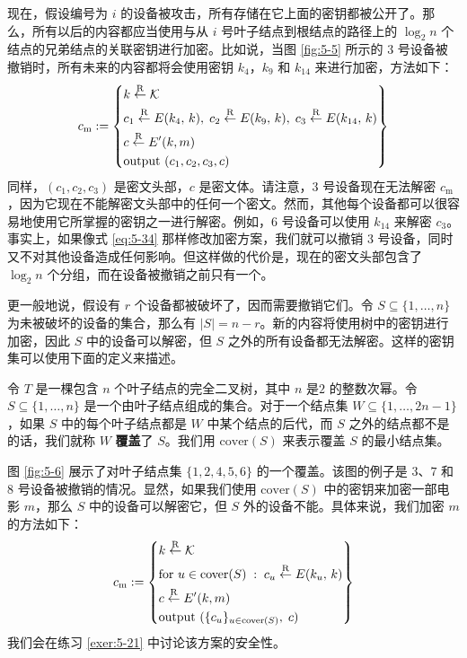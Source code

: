 \begin{snote}[撤销设备。]
现在，假设编号为 $i$ 的设备被攻击，所有存储在它上面的密钥都被公开了。那么，所有以后的内容都应当使用与从 $i$ 号叶子结点到根结点的路径上的 $\log_2n$ 个结点的兄弟结点的关联密钥进行加密。比如说，当图 \ref{fig:5-5} 所示的 $3$ 号设备被撤销时，所有未来的内容都将会使用密钥 $k_4$，$k_9$ 和 $k_{14}$ 来进行加密，方法如下：
\begin{equation}\label{eq:5-34}
c_\mathrm{m}:=
\left\{
\begin{aligned}
& k\overset{\rm R}\leftarrow\mathcal{K}\\
& c_1\overset{\rm R}\leftarrow E(k_4,\,k),\;
c_2\overset{\rm R}\leftarrow E(k_9,\,k),\;
c_3\overset{\rm R}\leftarrow E(k_{14},\,k)\\
& c\overset{\rm R}\leftarrow E'(k,m)\\
& \text{output } (c_1,c_2,c_3,c)
\end{aligned}
\right\}
\end{equation}
同样，$(c_1,c_2,c_3)$ 是密文头部，$c$ 是密文体。请注意，$3$ 号设备现在无法解密 $c_\mathrm{m}$，因为它现在不能解密文头部中的任何一个密文。然而，其他每个设备都可以很容易地使用它所掌握的密钥之一进行解密。例如，$6$ 号设备可以使用 $k_{14}$ 来解密 $c_3$。事实上，如果像式 \ref{eq:5-34} 那样修改加密方案，我们就可以撤销 $3$ 号设备，同时又不对其他设备造成任何影响。但这样做的代价是，现在的密文头部包含了 $\log_2n$ 个分组，而在设备被撤销之前只有一个。

更一般地说，假设有 $r$ 个设备都被破坏了，因而需要撤销它们。令 $S\subseteq\{1,\dots,n\}$ 为未被破坏的设备的集合，那么有 $|S|=n-r$。新的内容将使用树中的密钥进行加密，因此 $S$ 中的设备可以解密，但 $S$ 之外的所有设备都无法解密。这样的密钥集可以使用下面的定义来描述。
\end{snote}

\begin{definition}\label{def:5-4}
令 $T$ 是一棵包含 $n$ 个叶子结点的完全二叉树，其中 $n$ 是$2$ 的整数次幂。令 $S\subseteq\{1,\dots,n\}$ 是一个由叶子结点组成的集合。对于一个结点集 $W\subseteq\{1,\dots,2n-1\}$，如果 $S$ 中的每个叶子结点都是 $W$ 中某个结点的后代，而 $S$ 之外的结点都不是的话，我们就称 $W$ \textbf{覆盖}了 $S$。我们用 $\mathrm{cover}(S)$ 来表示覆盖 $S$ 的最小结点集。
\end{definition}

图 \ref{fig:5-6} 展示了对叶子结点集 $\{1,2,4,5,6\}$ 的一个覆盖。该图的例子是 $3$、$7$ 和 $8$ 号设备被撤销的情况。显然，如果我们使用 $\mathrm{cover}(S)$ 中的密钥来加密一部电影 $m$，那么 $S$ 中的设备可以解密它，但 $S$ 外的设备不能。具体来说，我们加密 $m$ 的方法如下：
\begin{equation}\label{eq:5-35}
c_\mathrm{m}:=
\left\{
\begin{aligned}
& k\overset{\rm R}\leftarrow\mathcal{K}\\
& \text{for } u\in\mathrm{cover}(S)\;:\; c_u\overset{\rm R}\leftarrow E(k_u,\,k)\\
& c\overset{\rm R}\leftarrow E'(k,m)\\
& \text{output } (\{c_u\}_{u\in\mathrm{cover}(S)},\;c)
\end{aligned}
\right\}
\end{equation}
我们会在练习 \ref{exer:5-21} 中讨论该方案的安全性。


